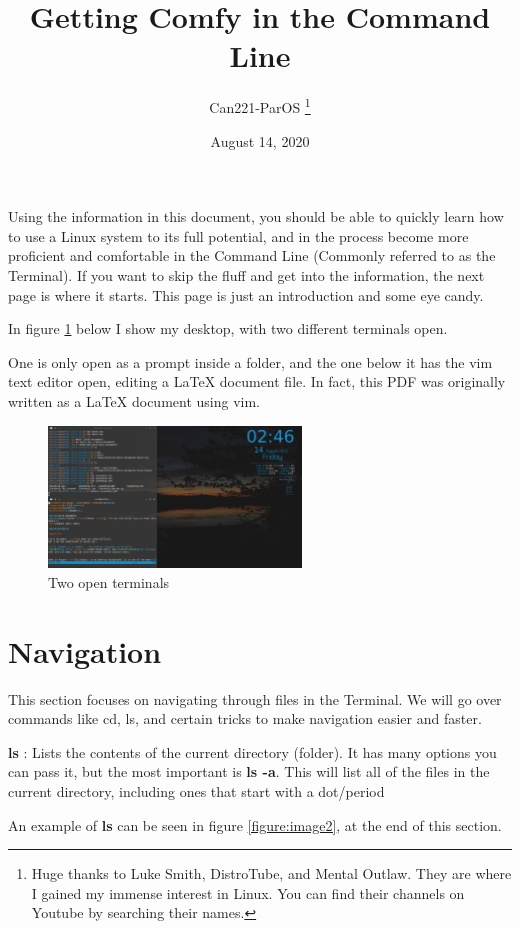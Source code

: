 \documentclass[12pt, letterpaper, twoside]{article}
\title{Getting Comfy in the Command Line}
\author{Can221-ParOS \thanks{Huge thanks to Luke Smith, DistroTube, and Mental Outlaw. They are where I gained my immense interest in Linux. You can find their channels on Youtube by searching their names.}}
\date{August 14, 2020}
\begin{document}
\maketitle


Using the information in this document, you should be able to quickly learn how to use a Linux system to its full potential, and in the process become more proficient and comfortable in the Command Line (Commonly referred to as the Terminal). If you want to skip the fluff and get into the information, the next page is where it starts. This page is just an introduction and some eye candy. 


In figure \ref{figure:image1} below I show my desktop, with two different terminals open. 

One is only open as a prompt inside a folder, and the one below it has the vim text editor open, editing a \LaTeX{} document file. 
In fact, this PDF was originally written as a \LaTeX{} document using vim.


\begin{figure} [ht]
        \centering
	\includegraphics[width=0.60\textwidth]{screen}
	\caption{Two open terminals}
	\label{figure:image1}
\end{figure}

\section{Navigation}


This section focuses on navigating through files in the Terminal. We will go over commands like cd, ls, and certain tricks to make navigation easier and faster.

\textbf{ls} : Lists the contents of the current directory (folder). It has many options you can pass it, but the most important is \textbf{ls -a}. This will list all of the files in the current directory, including ones that start with a dot/period

An example of \textbf{ls} can be seen in figure \ref{figure:image2}, at the end of this section.
\end{document}
